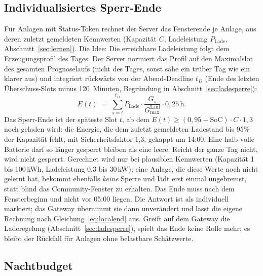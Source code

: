 \documentclass[11pt,a4paper]{article}
\begin{document}
\subsection{Individualisiertes Sperr-Ende}\label{sec:individuell}

Für Anlagen mit Status-Token rechnet der Server das Fensterende je Anlage,
aus deren zuletzt gemeldeten Kennwerten (Kapazität $C$, Ladeleistung
$P_{\text{Lade}}$, Abschnitt~\ref{sec:lernen}). Die Idee: Die erreichbare
Ladeleistung folgt dem Erzeugungsprofil des Tages. Der Server normiert das
Profil auf den Maximalslot des gesamten Prognoselaufs (nicht des Tages,
sonst sähe ein trüber Tag wie ein klarer aus) und integriert rückwärts von
der Abend-Deadline $t_D$ (Ende des letzten Überschuss-Slots minus
120~Minuten, Begründung in Abschnitt~\ref{sec:ladesperre}):
\begin{equation}
  E(t) \;=\; \sum_{s=t}^{t_D} P_{\text{Lade}} \cdot
  \frac{G_s}{G_{\max}^{\text{Lauf}}} \cdot 0{,}25\,\text{h}.
\end{equation}
Das Sperr-Ende ist der späteste Slot $t$, ab dem
$E(t) \geq (0{,}95 - \text{SoC}) \cdot C \cdot 1{,}3$ noch geladen
wird: die Energie, die dem zuletzt gemeldeten Ladestand bis 95\% der
Kapazität fehlt, mit Sicherheitsfaktor 1,3, gekappt um 14:00. Eine halb
volle Batterie darf so länger gesperrt bleiben als eine leere. Reicht der
ganze Tag nicht, wird nicht gesperrt. Gerechnet wird nur bei plausiblen
Kennwerten (Kapazität 1 bis 100\,kWh, Ladeleistung 0,3 bis 30\,kW); eine
Anlage, die diese Werte noch nicht gelernt hat, bekommt ebenfalls
\emph{keine} Sperre und lädt erst einmal ungebremst, statt blind das
Community-Fenster zu erhalten. Das Ende muss nach dem Fensterbeginn und
nicht vor 05:00 liegen. Die
Antwort ist als individuell markiert; das Gateway übernimmt sie dann
unverändert und lässt die eigene Rechnung nach
Gleichung~\eqref{eq:localend} aus. Greift auf dem Gateway die
Laderegelung (Abschnitt~\ref{sec:ladesperre}), spielt das Ende keine Rolle
mehr; es bleibt der Rückfall für Anlagen ohne belastbare Schätzwerte.

\subsection{Nachtbudget}\label{sec:nachtbudget}
\end{document}
